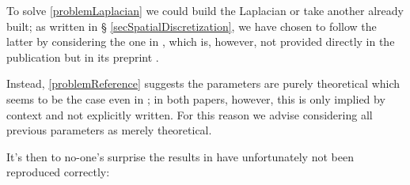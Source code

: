 \documentclass{article}
\begin{document}
                To solve \ref{problemLaplacian} we could build the Laplacian or take another already built; as written in § \ref{secSpatialDiscretization}, we have chosen to follow the latter by considering the one in \cite{Goriely2019}, which is, however, not provided directly in the publication but in its preprint \cite{Goriely2019_L}.

                Instead, \ref{problemReference} suggests the parameters are purely theoretical which seems to be the case even in \cite{Goriely2019}; in both papers, however, this is only implied by context and not explicitly written. For this reason we advise considering all previous parameters as merely theoretical.

                It's then to no-one's surprise the results in \cite{Fornari2019} have unfortunately not been reproduced correctly:
\end{document}
